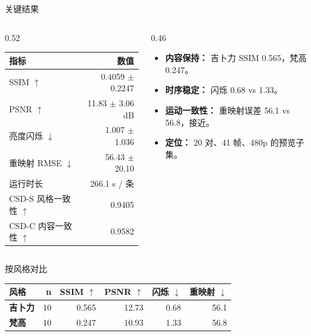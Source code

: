 \documentclass[aspectratio=169,11pt]{beamer}
\newcommand{\headrow}[1]{\color{white}\bfseries #1}
\begin{document}
\begin{frame}{关键结果}
\begin{columns}[T]
\begin{column}{0.52\textwidth}
\small
\begin{tabular}{lr}
\toprule
\rowcolor{navy}\headrow{指标} & \headrow{数值} \\
\midrule
SSIM $\uparrow$ & 0.4059 $\pm$ 0.2247 \\
PSNR $\uparrow$ & 11.83 $\pm$ 3.06 dB \\
亮度闪烁 $\downarrow$ & 1.007 $\pm$ 1.036 \\
重映射 RMSE $\downarrow$ & 56.43 $\pm$ 20.10 \\
运行时长 & 266.1 s / 条 \\
CSD-S 风格一致性 $\uparrow$ & 0.9405 \\
CSD-C 内容一致性 $\uparrow$ & 0.9582 \\

\bottomrule
\end{tabular}
\end{column}
\begin{column}{0.46\textwidth}
\small
\begin{itemize}
\item \textbf{内容保持：} 吉卜力 SSIM 0.565，梵高 0.247。
\item \textbf{时序稳定：} 闪烁 0.68 vs 1.33。
\item \textbf{运动一致性：} 重映射误差 56.1 vs 56.8，接近。
\item \textbf{定位：} 20 对、41 帧、480p 的预览子集。
\end{itemize}
\end{column}
\end{columns}
\end{frame}


\begin{frame}{按风格对比}
\small
\begin{tabular}{lrrrrr}
\toprule
\rowcolor{navy}\headrow{风格} & \headrow{n} & \headrow{SSIM $\uparrow$} & \headrow{PSNR $\uparrow$} &
\headrow{闪烁 $\downarrow$} & \headrow{重映射 $\downarrow$} \\
\midrule
\textbf{吉卜力} & 10 & 0.565 & 12.73 & 0.68 & 56.1 \\
\textbf{梵高} & 10 & 0.247 & 10.93 & 1.33 & 56.8 \\
\bottomrule
\end{tabular}
\end{frame}
\end{document}
